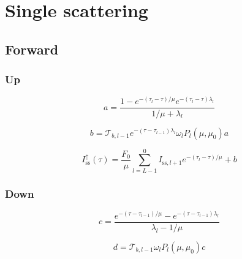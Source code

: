 %
\section{Single scattering}
\label{sec:single_scattering}

\subsection{Forward}
\label{sec:single_scattering-forward}

\subsubsection{Up}
\label{sec:single_scattering-forward-up}

\begin{equation}
a = \frac{1 - e^{- (\tau_{l} - \tau) / \mu}e^{- (\tau_{l} - \tau) \lambda_{l}}}{1/\mu + \lambda_{l}}
\label{eq:single_scattering-forward-up-a}
\end{equation}

\begin{equation}
b = \mathcal{T}_{b,l-1} e^{-(\tau - \tau_{l-1}) \lambda_{l}} \omega_{l} P_{l}(\mu, \mu_0) a
\label{eq:single_scattering-forward-up-b}
\end{equation}

\begin{equation}
I^{\uparrow}_{\mathrm{ss}}(\tau) = \frac{F_{0}}{\mu} \sum^{0}_{l = L-1} I_{\mathrm{ss},l + 1} e^{-(\tau_{l} - \tau) / \mu} + b
\label{eq:single_scattering-forward-up-I_up_ss}
\end{equation}


%
\subsubsection{Down}
\label{sec:single_scattering-forward-down}

\begin{equation}
c = \frac{e^{- (\tau - \tau_{l-1}) / \mu} - e^{- (\tau - \tau_{l-1}) \lambda_{l}}}{\lambda_{l} - 1/\mu}
\label{eq:single_scattering-forward-down-c}
\end{equation}

\begin{equation}
d = \mathcal{T}_{b,l-1} \omega_{l} P_{l}(\mu, \mu_0) c
\label{eq:single_scattering-forward-down-d}
\end{equation}

